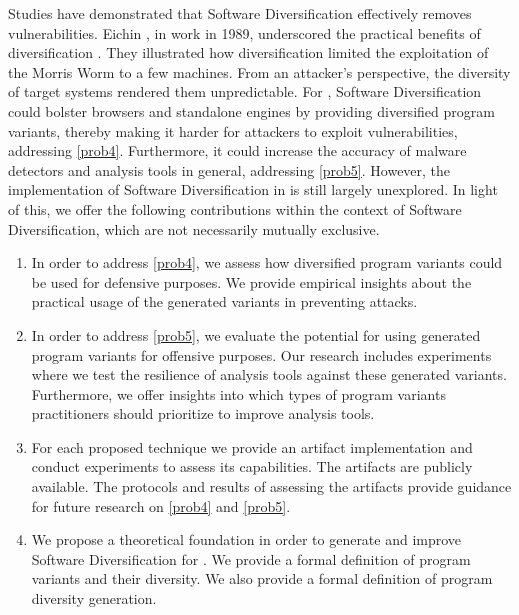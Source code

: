 Studies have demonstrated that Software Diversification effectively removes vulnerabilities. 
Eichin \etal, in work in 1989, underscored the practical benefits of diversification \cite{36307}. 
They illustrated how diversification limited the exploitation of the Morris Worm to a few machines. 
From an attacker's perspective, the diversity of target systems rendered them unpredictable.
For \Wasm, Software Diversification could bolster browsers and standalone engines by providing diversified program variants, thereby making it harder for attackers to exploit vulnerabilities, addressing \ref{prob4}. 
Furthermore, it could increase the accuracy of \Wasm malware detectors and \Wasm analysis tools in general, addressing \ref{prob5}. 
However, the implementation of Software Diversification in \Wasm is still largely unexplored. 
In light of this, we offer the following contributions within the context of Software Diversification, which are not necessarily mutually exclusive.


\begin{enumerate}[label=\textbf{C\arabic*}, ref=C\arabic*]

	\item \label{defensivecontrib}  In order to address \ref{prob4}, we assess how diversified \Wasm program variants could be used for defensive purposes. We provide empirical insights about the practical usage of the generated variants in preventing attacks.
	
	\item \label{ofensivecontrib}  
	In order to address \ref{prob5}, we evaluate the potential for using generated \Wasm program variants for offensive purposes. 
	Our research includes experiments where we test the resilience of \Wasm analysis tools against these generated variants. 
	Furthermore, we offer insights into which types of program variants practitioners should prioritize to improve \Wasm analysis tools.

	\item \label{methodcontrib}  For each proposed technique we provide an artifact implementation and conduct experiments to assess its capabilities. The artifacts are publicly available. The protocols and results of assessing the artifacts provide guidance for future research on \ref{prob4} and \ref{prob5}.
	
	\item \label{therycontrib}  We propose a theoretical foundation in order to generate and improve Software Diversification for \Wasm. We provide a formal definition of \Wasm program variants and their diversity. We also provide a formal definition of \Wasm program diversity generation.
	
	

	
\end{enumerate}

